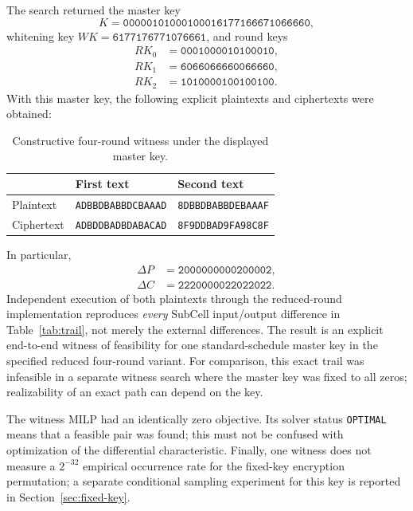 \documentclass[11pt,a4paper]{article}
\begin{document}
The search returned the master key
\[
 K=\texttt{00000101000100016177166671066660},
\]
whitening key $WK=\texttt{6177176771076661}$, and round keys
\begin{align*}
 RK_0&=\texttt{0001000010100010},\\
 RK_1&=\texttt{6066066660066660},\\
 RK_2&=\texttt{1010000100100100}.
\end{align*}
With this master key, the following explicit plaintexts and ciphertexts were
obtained:
\begin{table}[H]
 \centering
 \caption{Constructive four-round witness under the displayed master key.}\label{tab:pair}
 \footnotesize
 \begin{tabular}{lll}
 \toprule
 & First text & Second text\\
 \midrule
 Plaintext & \texttt{ADBBDBABBDCBAAAD} & \texttt{8DBBDBABBDEBAAAF}\\
 Ciphertext & \texttt{ADBDDBADBDABACAD} & \texttt{8F9DDBAD9FA98C8F}\\
 \bottomrule
 \end{tabular}
\end{table}
In particular,
\begin{align*}
 \Delta P&=\texttt{2000000000200002},\\
 \Delta C&=\texttt{2220000022022022}.
\end{align*}
Independent execution of both plaintexts through the reduced-round
implementation reproduces \emph{every} SubCell input/output difference in
Table~\ref{tab:trail}, not merely the external differences. The result is an
explicit end-to-end witness of feasibility for one standard-schedule master
key in the specified reduced four-round variant. For comparison, this exact
trail was infeasible in a separate witness search where the master key was
fixed to all zeros; realizability of an exact path can depend on the key.

The witness MILP had an identically zero objective. Its solver status
\texttt{OPTIMAL} means that a feasible pair was found; this must not be
confused with optimization of the differential characteristic. Finally, one
witness does not measure a $2^{-32}$ empirical occurrence rate for the
fixed-key encryption permutation; a separate conditional sampling
experiment for this key is reported in Section~\ref{sec:fixed-key}.
\end{document}
